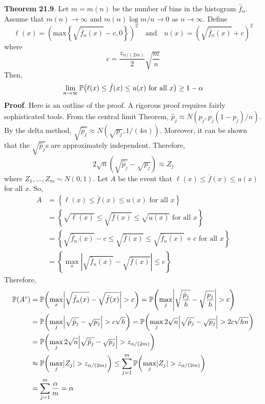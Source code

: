\textbf{Theorem 21.9}. Let \(m = m(n)\) be the number of bins in the histogram \(\hat{f}_{n}\). Assume that \(m(n) \rightarrow \infty\) and \(m(n) \log m / n \rightarrow 0\) as \(n \rightarrow \infty\). Define
\[
\ell(x) = \left( \text{max} \left\{\sqrt{\hat{f}_{n}(x)} - c, 0\right\} \right)^{2}
\quad \text{and} \quad
u(x) = \left(\sqrt{\hat{f}_{n}(x)} + c \right)^{2}
\]
where
\[
c = \frac{z_{\alpha / (2 m)}}{2} \sqrt{\frac{m}{n}}
\]
Then,
\[
\lim_{n \rightarrow \infty} \PROB \left( \ell(x) \leq \bar{f}(x) \leq u(x) \text{ for all } x \right) \geq 1 - \alpha
\]
\textbf{Proof}. Here is an outline of the proof. A rigorous proof requires fairly sophisticated tools. From the central limit Theorem, \(\hat{p}_{j} \approx N\left(p_{j}, p_{j} (1 - p_{j}) / n\right)\). By the delta method, \(\sqrt{\hat{p}_{j}} \approx N\left(\sqrt{p_{j}}, 1 / (4n)\right)\). Moreover, it can be shown that the \(\sqrt{\hat{p}_{j}}\)s are approximately independent. Therefore,
\[
2 \sqrt{n} \left( \sqrt{\hat{p}_{j}} - \sqrt{p_{j}} \right) \approx Z_{j}
\]
where \(Z_{1}, \dots, Z_m \sim N(0, 1)\). Let \(A\) be the event that \(\ell(x) \leq \bar{f}(x) \leq u(x)\) for all \(x\). So,
\begin{align*}
A &= \left\{ \ell(x) \leq \bar{f}(x) \leq u(x) \text{ for all } x \right\} \\
&= \left\{ \sqrt{\ell(x)} \leq \sqrt{\bar{f}(x)} \leq \sqrt{u(x)} \text{ for all } x \right\} \\
&= \left\{ \sqrt{\hat{f}_{n}(x)} - c \leq \sqrt{\bar{f}(x)} \leq \sqrt{\hat{f}_{n}(x)} + c \text{ for all } x \right\} \\
&= \left\{ \max_x \left| \sqrt{\hat{f}_{n}(x)} - \sqrt{\bar{f}(x)} \right| \leq c \right\}
\end{align*}
Therefore,
\begin{align*}
\PROB(A^{c}) &= \PROB \left( \max_x \left| \sqrt{\hat{f}_{n}(x)} - \sqrt{\bar{f}(x)} \right| > c\right)
= \PROB \left( \max_{j} \left| \sqrt{\frac{\hat{p}_{j}}{h}} - \sqrt{\frac{p_{j}}{h}} \right| > c\right) \\
&= \PROB \left( \max_{j} \left| \sqrt{\hat{p}_{j}} - \sqrt{p_{j}} \right| > c \sqrt{h} \right)
= \PROB \left( \max_{j} 2 \sqrt{n} \left| \sqrt{\hat{p}_{j}} - \sqrt{p_{j}} \right| > 2 c \sqrt{hn} \right) \\
&= \PROB \left( \max_{j} 2 \sqrt{n} \left| \sqrt{\hat{p}_{j}} - \sqrt{p_{j}} \right| > z_{\alpha / (2m)} \right) \\
&\approx \PROB \left( \max_{j} \left| Z_{j} \right| > z_{\alpha / (2m)} \right)
 \leq \sum_{j=1}^m \PROB \left( \max_{j} \left| Z_{j} \right| > z_{\alpha / (2m)} \right) \\
&= \sum_{j=1}^m \frac{\alpha}{m} = \alpha
\end{align*}

